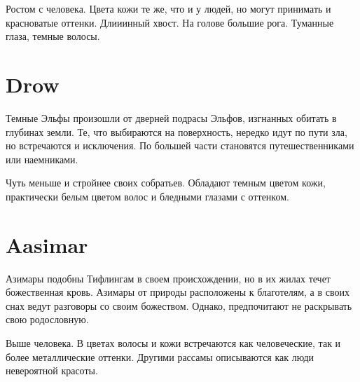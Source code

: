\documentclass[a5paper,11pt]{book}
\begin{document}
\begin{multicols}{2}
Ростом с человека. Цвета кожи те же, что и у людей, но могут принимать и красноватые оттенки. Длииинный хвост. На голове большие рога. Туманные глаза, темные волосы.


%

\section{Drow}

Темные Эльфы произошли от дверней подрасы Эльфов, изгнанных обитать в глубинах земли. Те, что выбираются на поверхность, нередко идут по пути зла, но встречаются и исключения. По большей части становятся путешественниками или наемниками.

Чуть меньше и стройнее своих собратьев. Обладают темным цветом кожи, практически белым цветом волос и бледными глазами с оттенком.


\section{Aasimar}

Азимары подобны Тифлингам в своем происхождении, но в их жилах течет божественная кровь.  Азимары от природы расположены к благотелям, а в своих снах ведут разговоры со своим божеством. Однако, предпочитают не раскрывать свою родословную.

Выше человека. В цветах волосы и кожи встречаются как человеческие, так и более металлические оттенки. Другими рассамы описываются как люди невероятной красоты. 





\end{multicols}
\end{document}
